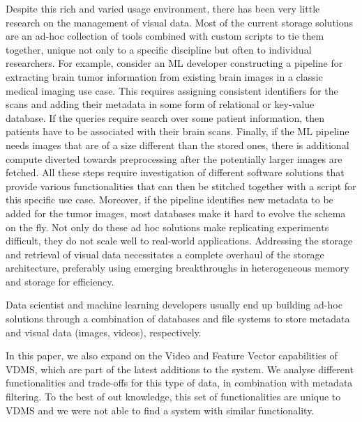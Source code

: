 Despite this rich and varied usage environment, there has been very little
research on the management of visual data.
Most of the current storage solutions are
an ad-hoc collection of tools combined with custom scripts to tie them
together, unique not only to a specific discipline but often to individual
researchers. For example, consider an ML developer constructing a pipeline
for extracting brain tumor information from existing brain images in a
classic medical imaging use case. This requires assigning consistent
identifiers for the scans and adding their metadata in
some form of relational or key-value database. If the queries require
search over some patient information, then patients have to be associated
with their brain scans. Finally, if the ML pipeline needs images that
are of a size different than the stored ones, there is additional compute
diverted towards preprocessing after the potentially larger images are
fetched. All these steps require investigation of different software
solutions that provide various functionalities that can then be stitched
together with a script for this specific use case.
Moreover, if the pipeline identifies
new metadata to be added for the tumor images, most databases make it
hard to evolve the schema on the fly.
Not only do these ad hoc solutions make replicating experiments
difficult, they do not scale well to real-world applications.
Addressing the storage and retrieval of visual data necessitates a complete
overhaul of the storage architecture,
preferably using emerging breakthroughs in
heterogeneous memory and storage for efficiency.

Data scientist and machine learning developers usually end up building ad-hoc
solutions through a combination of databases and file systems to store metadata
and visual data (images, videos), respectively.

In this paper, we also expand on the Video and Feature Vector capabilities of
VDMS, which are part of the latest additions to the system.
We analyse different functionalities and trade-offs for this type of data,
in combination with metadata filtering. To the best of out knowledge, this
set of functionalities are unique to VDMS and we were not able to find a system
with similar functionality.

\begin{comment}

We present the Visual Data Management System (VDMS)\cite{darkside},
an Open Source project designed to enable efficient access of visual data.
Since visual data often contains
rich metadata (such as objects, locations, and time), VDMS stores this
information in a high performance graph database. Using this metadata, VDMS
can quickly identify which data is relevant to a given query.
Additionally, VDMS uses a custom library to store and retrieve visual data,
which provides an interface for machine friendly formats as well as
traditional formats. These new formats are designed to support applications
that are often interested in specific areas of images or videos,
particularly when the individual object is large.

\end{comment}
